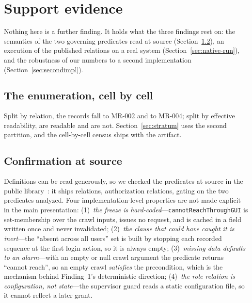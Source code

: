 \section{Support evidence}
\label{sec:support}

Nothing here is a further finding. It holds what the three findings rest on: the semantics of the
two governing predicates read at source (Section~\ref{sec:impl}), an execution of the published
relations on a real system (Section~\ref{sec:native-run}), and the robustness of our numbers to a
second implementation (Section~\ref{sec:secondimpl}).

\subsection{The enumeration, cell by cell}
\label{sec:census}

Split by relation, the \ResSynRecords{} records fall \DsgMrTwo{} to MR-002 and \DsgMrFour{} to
MR-004; split by effective readability, \DsgFullOn{} are readable and \DsgFullOff{} are not.
Section~\ref{sec:stratum} uses the second partition, and the cell-by-cell census ships with the
artifact.

\subsection{Confirmation at source}
\label{sec:impl}

Definitions can be read generously, so we checked the predicates at source in the public
library~\cite{Chaleshtari2022Metamorphic}: it ships \ResArtMrTotal{} relations,
\ResArtAuthzMrTotal{} authorization relations, \ResArtAuthzGatedEither{} gating on the two
predicates analyzed. Four implementation-level properties are not made explicit in the main
presentation: (1)~\emph{the freeze is hard-coded}---\texttt{cannotReachThroughGUI} is
set-membership over the crawl inputs, issues no request, and is cached in a field written once
and never invalidated; (2)~\emph{the clause that could have caught it is inert}---the ``absent
across all users'' set is built by stopping each recorded sequence at the first login action, so
it is always empty; (3)~\emph{missing data defaults to an alarm}---with an empty or null crawl
argument the predicate returns ``cannot reach'', so an empty crawl \emph{satisfies} the
precondition, which is the mechanism behind Finding~1's deterministic direction;
(4)~\emph{the role relation is configuration, not state}---the supervisor guard reads a static
configuration file, so it cannot reflect a later grant.

